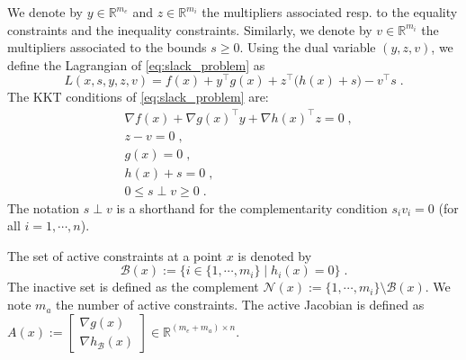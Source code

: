 We denote by $y \in \mathbb{R}^{m_e}$ and $z \in \mathbb{R}^{m_i}$ the multipliers associated
resp. to the equality constraints and the inequality constraints.
Similarly, we denote
by $v \in \mathbb{R}^{m_i}$ the multipliers associated
to the bounds $s \geq 0$.
Using the dual variable $(y, z, v)$, we define the Lagrangian of \eqref{eq:slack_problem} as
\begin{equation}
  \label{eq:lagrangian}
  L(x, s, y, z, v) = f(x) + y^\top g(x) + z^\top \big(h(x) +s\big)
  - v^\top s \; .
\end{equation}
The KKT conditions of \eqref{eq:slack_problem} are:
\begin{subequations}
  \label{eq:kktconditions}
    \begin{align}
      & \nabla f(x) + \nabla g(x)^\top y + \nabla h(x)^\top z  = 0 \; , \\
      & z - v = 0 \; , \\
      & g(x) = 0 \; , \\
      & h(x) + s = 0 \; , \\
      \label{eq:kktconditions:comps}
      & 0 \leq s \perp v \geq 0 \; .
    \end{align}
\end{subequations}
The notation $s \perp v$ is a shorthand for the complementarity
condition $s_i v_i = 0$ (for all $i=1,\cdots, n$).

The set of active constraints at a point $x$ is denoted by
\begin{equation}
  \mathcal{B}(x) := \{ i \in\{ 1, \cdots, m_i\} \; | \; h_i(x) = 0 \} \; .
\end{equation}
The inactive set is defined as the complement $\mathcal{N}(x) := \{1, \cdots, m_i \} \setminus \mathcal{B}(x)$.
We note $m_a$ the number of active constraints.
The active Jacobian is defined as $A(x) := \begin{bmatrix} \nabla g(x) \\ \nabla h_{\mathcal{B}}(x) \end{bmatrix} \in \mathbb{R}^{(m_e + m_a) \times n}$.


